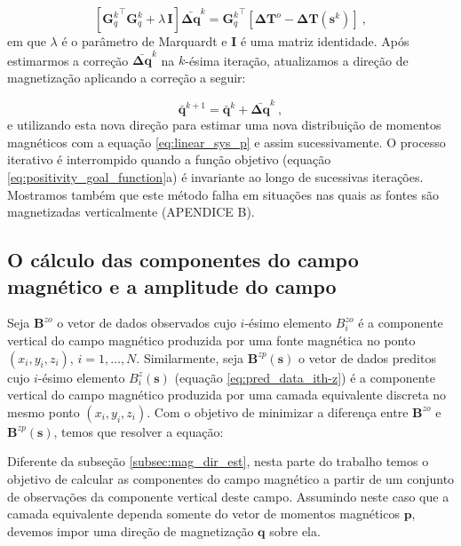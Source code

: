 \begin{equation}
\left[ {\mathbf{G}_{q}^{k}}^{\top} \mathbf{G}_{q}^{k} + \lambda \, \mathbf{I} \right] 
\bar{\mathbf{\Delta q}}^{k} = {\mathbf{G}_{q}^{k}}^{\top} 
\left[ \mathbf{\Delta T}^{o} - \mathbf{\Delta T} (\mathbf{s}^{k}) \right] \: ,
\label{eq:linear_sys_q}
\end{equation}
em que $\lambda$ é o parâmetro de Marquardt e $\mathbf{I}$ é uma matriz identidade. Após estimarmos a correção $\bar{\mathbf{\Delta q}}^{k}$ na $k$-ésima iteração, atualizamos a direção de magnetização aplicando a correção a seguir:

\begin{equation}
\bar{\mathbf{q}}^{k+1} = \bar{\mathbf{q}}^{k} + \bar{\mathbf{\Delta q}}^{k} \: ,
\label{eq:q_next}
\end{equation}
e utilizando esta nova direção para estimar uma nova distribuição de momentos magnéticos com a equação \ref{eq:linear_sys_p} e assim sucessivamente. O processo iterativo é interrompido quando a função objetivo (equação \ref{eq:positivity_goal_function}a) é invariante ao longo de sucessivas iterações. Mostramos também que este método falha em situações nas quais as fontes são magnetizadas verticalmente (APENDICE B).

\subsection{O cálculo das componentes do campo magnético e a amplitude do campo}
\label{subsec:componentes_vec}

Seja $\mathbf{B}^{zo}$ o vetor de dados observados cujo $i$-ésimo elemento $B_{i}^{zo}$ é a componente vertical do campo magnético produzida por uma fonte magnética no ponto $(x_{i},y_{i},z_{i})$, $i = 1, \dots, N$. Similarmente, seja $\mathbf{B}^{zp} (\mathbf{s})$ o vetor de dados preditos cujo $i$-ésimo elemento $B_{i}^{z}(\mathbf{s})$ (equação \ref{eq:pred_data_ith-z}) é a componente vertical do campo magnético produzida por uma camada equivalente discreta no mesmo ponto $(x_{i},y_{i},z_{i})$. Com o objetivo de minimizar a diferença entre $\mathbf{B}^{zo}$ e $\mathbf{B}^{zp} (\mathbf{s})$, temos que resolver a equação:

Diferente da subseção \ref{subsec:mag_dir_est}, nesta parte do trabalho temos o objetivo de calcular as componentes do campo magnético a partir de um conjunto de observações da componente vertical deste campo. Assumindo neste caso que a camada equivalente dependa somente do vetor de momentos magnéticos $\mathbf{p}$, devemos impor uma direção de magnetização $\mathbf{q}$ sobre ela.


